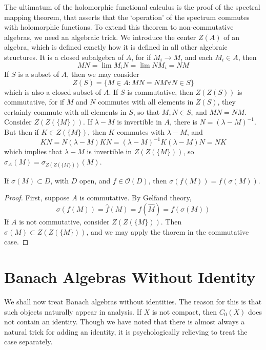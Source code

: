 The ultimatum of the holomorphic functional calculus is the proof of the spectral mapping theorem, that asserts that the `operation' of the spectrum commutes with holomorphic functions. To extend this theorem to non-commutative algebras, we need an algebraic trick. We introduce the center $Z(A)$ of an algebra, which is defined exactly how it is defined in all other algebraic structures. It is a closed subalgebra of $A$, for if $M_i \to M$, and each $M_i \in A$, then
%
\[ MN = \lim M_iN = \lim NM_i = NM \]
%
If $S$ is a subset of $A$, then we may consider
%
\[ Z(S) = \{ M \in A : MN = NM \forall N \in S \} \]
%
which is also a closed subset of $A$. If $S$ is commutative, then $Z(Z(S))$ is commutative, for if $M$ and $N$ commutes with all elements in $Z(S)$, they certainly commute with all elements in $S$, so that $M,N \in S$, and $MN = NM$. Consider $Z(Z(\{ M \}))$. If $\lambda - M$ is invertible in $A$, there is $N = (\lambda - M)^{-1}$. But then if $K \in Z(\{ M \})$, then $K$ commutes with $\lambda - M$, and
%
\[ KN = N(\lambda - M) K N = (\lambda - M)^{-1} K (\lambda - M) N = NK \]
%
which implies that $\lambda - M$ is invertible in $Z(Z(\{M\}))$, so $\sigma_A(M) = \sigma_{Z(Z(\{M\}))}(M)$.

\begin{theorem}
    If $\sigma(M) \subset D$, with $D$ open, and $f \in \mathcal{O}(D)$, then $\sigma(f(M)) = f(\sigma(M))$.
\end{theorem}
\begin{proof}
    First, suppose $A$ is commutative. By Gelfand theory,
    \[ \sigma(f(M)) = \widehat{f}(M) = f(\hat{M}) = f(\sigma(M)) \]
    If $A$ is not commutative, consider $Z(Z(\{M\}))$. Then $\sigma(M) \subset Z(Z(\{M\}))$, and we may apply the thorem in the commutative case.
\end{proof}





\section{Banach Algebras Without Identity}

We shall now treat Banach algebras without identities. The reason for this is that such objects naturally appear in analysis. If $X$ is not compact, then $C_0(X)$ does not contain an identity. Though we have noted that there is almost always a natural trick for adding an identity, it is psychologically relieving to treat the case separately.

